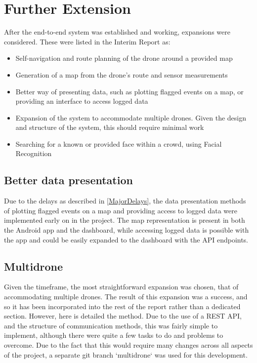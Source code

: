 \documentclass{article}
\begin{document}
\section{Further Extension}
After the end-to-end system was established and working, expansions were considered. These were listed in the Interim Report as:
\begin{itemize}
    \item Self-navigation and route planning of the drone around a provided map
    \item Generation of a map from the drone's route and sensor measurements
    \item Better way of presenting data, such as plotting flagged events on a map, or providing an interface to access logged data
    \item Expansion of the system to accommodate multiple drones. Given the design and structure of the system, this should require minimal work
    \item Searching for a known or provided face within a crowd, using Facial Recognition
\end{itemize}
\subsection{Better data presentation}
Due to the delays as described in \ref{MajorDelays}, the data presentation methods of plotting flagged events on a map and providing access to logged data were implemented early on in the project. The map representation is present in both the Android app and the dashboard, while accessing logged data is possible with the app and could be easily expanded to the dashboard with the API endpoints. 

\subsection{Multidrone}
Given the timeframe, the most straightforward expansion was chosen, that of accommodating multiple drones. The result of this expansion was a success, and so it has been incorporated into the rest of the report rather than a dedicated section. However, here is detailed the method. Due to the use of a REST API, and the structure of communication methods, this was fairly simple to implement, although there were quite a few tasks to do and problems to overcome. Due to the fact that this would require many changes across all aspects of the project, a separate git branch `multidrone` was used for this development. 
\end{document}
